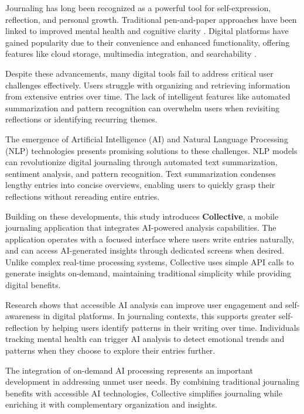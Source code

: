 Journaling has long been recognized as a powerful tool for self-expression, reflection, and personal growth. Traditional pen-and-paper approaches have been linked to improved mental health and cognitive clarity \cite{pennebaker1999forming}. Digital platforms have gained popularity due to their convenience and enhanced functionality, offering features like cloud storage, multimedia integration, and searchability \cite{sloan2015efficacy}.

Despite these advancements, many digital tools fail to address critical user challenges effectively. Users struggle with organizing and retrieving information from extensive entries over time. The lack of intelligent features like automated summarization and pattern recognition can overwhelm users when revisiting reflections or identifying recurring themes.

The emergence of Artificial Intelligence (AI) and Natural Language Processing (NLP) technologies presents promising solutions to these challenges. NLP models can revolutionize digital journaling through automated text summarization, sentiment analysis, and pattern recognition. Text summarization condenses lengthy entries into concise overviews, enabling users to quickly grasp their reflections without rereading entire entries.

Building on these developments, this study introduces \textbf{Collective}, a mobile journaling application that integrates AI-powered analysis capabilities. The application operates with a focused interface where users write entries naturally, and can access AI-generated insights through dedicated screens when desired. Unlike complex real-time processing systems, Collective uses simple API calls to generate insights on-demand, maintaining traditional simplicity while providing digital benefits.

Research shows that accessible AI analysis can improve user engagement and self-awareness in digital platforms. In journaling contexts, this supports greater self-reflection by helping users identify patterns in their writing over time. Individuals tracking mental health can trigger AI analysis to detect emotional trends and patterns when they choose to explore their entries further.

The integration of on-demand AI processing represents an important development in addressing unmet user needs. By combining traditional journaling benefits with accessible AI technologies, Collective simplifies journaling while enriching it with complementary organization and insights.

